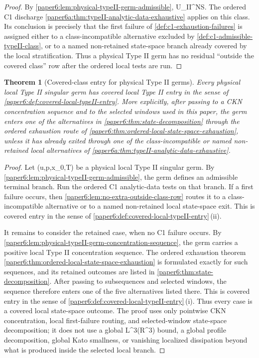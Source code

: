 \documentclass[11pt]{amsart}
\def\({}%
\def\){}%
\def\mathrm#1{#1}%
\def\mathbb#1{#1}%
\theoremstyle{plain}
\newtheorem{theorem}{Theorem}[section]
\theoremstyle{definition}
\theoremstyle{remark}
\begin{document}
\begin{proof}
By \cref{paper6:lem:physical-typeII-germ-admissible}, \(\omega\in
\mathcal U_{\mathrm{II}}^{NS}\).  The ordered C1 discharge
\cref{paper6a:thm:typeII-analytic-data-exhaustive} applies on this class.  Its
conclusion is precisely that the first failure of
\cref{def:c1-exhaustion-failures} is assigned either to a class-incompatible
alternative excluded by \cref{def:c1-admissible-typeII-class}, or to a named
non-retained state-space branch already covered by the local stratification.
Thus a physical Type II germ has no residual ``outside the covered class'' row
after the ordered local tests are run.
\end{proof}

\begin{theorem}[Covered-class entry for physical Type II germs]
\label{paper6:thm:physical-typeII-covered-entry}
Every physical local Type II singular germ has covered local Type II entry in
the sense of \cref{paper6:def:covered-local-typeII-entry}.  More explicitly,
after passing to a CKN concentration sequence and to the selected windows used
in this paper, the germ enters one of the alternatives in
\cref{paper6:thm:state-decomposition} through the ordered exhaustion route of
\cref{paper6:thm:ordered-local-state-space-exhaustion}, unless it has already exited through one
of the class-incompatible or named non-retained local alternatives of
\cref{paper6a:thm:typeII-analytic-data-exhaustive}.
\end{theorem}

\begin{proof}
Let \((u,p,x_0,T)\) be a physical local Type II singular germ.  By
\cref{paper6:lem:physical-typeII-germ-admissible}, the germ defines an
admissible terminal branch.  Run the ordered C1 analytic-data tests on that
branch.  If a first failure occurs, then
\cref{paper6:lem:no-extra-outside-class-row} routes it to a class-incompatible
alternative or to a named non-retained local state-space exit.  This is covered
entry in the sense of
\cref{paper6:def:covered-local-typeII-entry}\,\textup{(ii)}.

It remains to consider the retained case, when no C1 failure occurs.  By
\cref{paper6:lem:physical-typeII-germ-concentration-sequence}, the germ carries
a positive local Type II concentration sequence.  The ordered exhaustion theorem
\cref{paper6:thm:ordered-local-state-space-exhaustion} is formulated exactly
for such sequences, and its retained outcomes are listed in
\cref{paper6:thm:state-decomposition}.  After passing to subsequences and
selected windows, the sequence therefore enters one of the five alternatives
listed there.  This is covered entry in the sense of
\cref{paper6:def:covered-local-typeII-entry}\,\textup{(i)}.  Thus every case is
a covered local state-space outcome.  The proof uses only
pointwise CKN concentration, local first-failure routing, and selected-window
state-space decomposition; it does not use a global \(L^3(\mathbb R^3)\) bound,
a global profile decomposition, global Kato smallness, or vanishing localized
dissipation beyond what is produced inside the selected local branch.
\end{proof}
\end{document}
